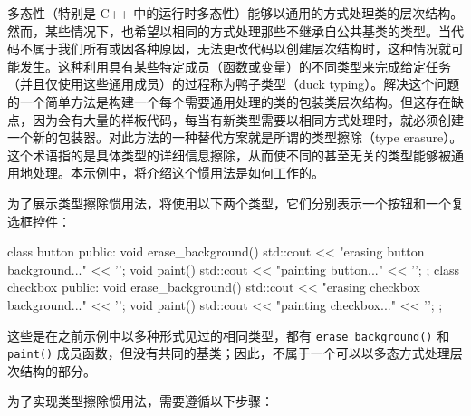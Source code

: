 
多态性（特别是 C++ 中的运行时多态性）能够以通用的方式处理类的层次结构。然而，某些情况下，也希望以相同的方式处理那些不继承自公共基类的类型。当代码不属于我们所有或因各种原因，无法更改代码以创建层次结构时，这种情况就可能发生。这种利用具有某些特定成员（函数或变量）的不同类型来完成给定任务（并且仅使用这些通用成员）的过程称为鸭子类型（duck typing）。解决这个问题的一个简单方法是构建一个每个需要通用处理的类的包装类层次结构。但这存在缺点，因为会有大量的样板代码，每当有新类型需要以相同方式处理时，就必须创建一个新的包装器。对此方法的一种替代方案就是所谓的类型擦除（type erasure）。这个术语指的是具体类型的详细信息擦除，从而使不同的甚至无关的类型能够被通用地处理。本示例中，将介绍这个惯用法是如何工作的。


为了展示类型擦除惯用法，将使用以下两个类型，它们分别表示一个按钮和一个复选框控件：

\begin{cpp}
class button
{
public:
    void erase_background()
    {
        std::cout << "erasing button background..." << '\n';
    }
    void paint()
    {
        std::cout << "painting button..." << '\n';
    }
};
class checkbox
{
public:
    void erase_background()
    {
        std::cout << "erasing checkbox background..." << '\n';
    }
    void paint()
    {
        std::cout << "painting checkbox..." << '\n';
    }
};
\end{cpp}

这些是在之前示例中以多种形式见过的相同类型，都有 \verb|erase_background()| 和 \verb|paint()| 成员函数，但没有共同的基类；因此，不属于一个可以以多态方式处理层次结构的部分。


为了实现类型擦除惯用法，需要遵循以下步骤：

